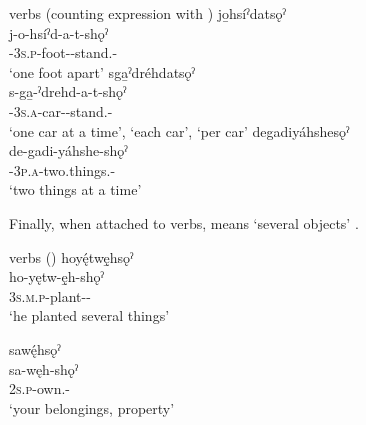 \ea\label{ex:soex3} verbs (counting expression with )
\ea\label{ex:soex3a} jo̱hsíˀdatsǫˀ\\
\gll j-o-hsíˀd-a-t-shǫˀ\\
 {\repetitive}-\textsc{3s.p}-foot-{\joinerA}-stand.\stative-\pluralizer\\
\glt `one foot apart'
\ex sga̱ˀdréhdatsǫˀ \\\label{ex:soex3b}
\gll s-ga̱-ˀdrehd-a-t-shǫˀ\\
 {\repetitive}-\textsc{3s.a}-car-{\joinerA}-stand.{\stat}-{\pluralizer}\\
\glt ‘one car at a time’, ‘each car’, `per car'
\ex degadiyáhshesǫˀ\\\label{ex:soex3c}
\gll de-gadi-yáhshe-shǫˀ\\
 {\dualic}-\textsc{3p.a}-two.things.{\stat}-{\pluralizer}\\
\glt `two things at a time'
\z
\z

Finally, when attached to verbs,  {\pluralizer} means ‘several objects’ .

\ea\label{ex:soex8} verbs ()
\ea hoyę́twę̱hsǫˀ\\
\gll ho-yętw-ę̱h-shǫˀ\\
 \textsc{3s.m.p}-plant-{\stat}-{\pluralizer}\\
\glt `he planted several things'

\ex sawę́hsǫˀ\\
\gll sa-węh-shǫˀ\\
 \textsc{2s.p}-own.{\stat}-{\pluralizer}\\
\glt `your belongings, property'

